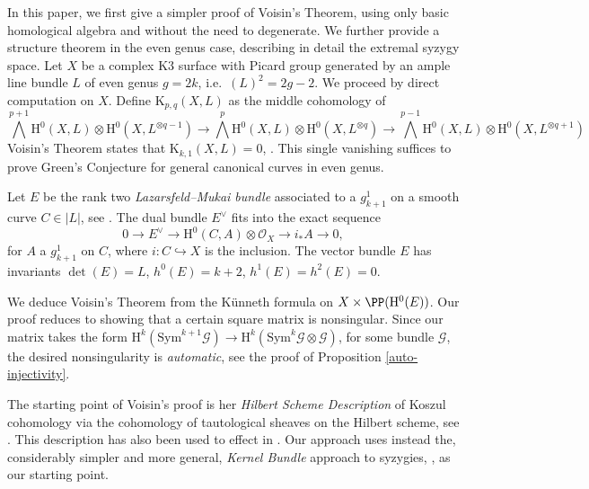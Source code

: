 
In this paper, we first give a simpler proof of Voisin's Theorem, using only basic homological algebra and without the need to degenerate. We further provide a structure theorem in the even genus case, describing in detail the extremal syzygy space. Let $X$ be a complex K3 surface with Picard group generated by an ample line bundle $L$ of even genus $g=2k$, i.e.\ $(L)^2=2g-2$. We proceed by direct computation on $X$. Define $\mathrm{K}_{p,q}(X,L)$ as the middle cohomology of
{\small{$$\bigwedge^{p+1} \mathrm{H}^0(X,L) \otimes \mathrm{H}^0(X,L^{\otimes q-1}) \to \bigwedge^p \mathrm{H}^0(X,L) \otimes \mathrm{H}^0(X,L^{\otimes q}) \to \bigwedge^{p-1} \mathrm{H}^0(X,L) \otimes \mathrm{H}^0(X,L^{\otimes q+1}) $$}}
 Voisin's Theorem states that $\mathrm{K}_{k,1}(X,L)=0$, \cite{V1}. This single vanishing suffices to prove Green's Conjecture for general canonical curves in even genus.


Let $E$ be the rank two \emph{Lazarsfeld--Mukai bundle} associated to a $g^1_{k+1}$ on a smooth curve $C \in |L|$, see \cite{lazarsfeld-BNP}. The dual bundle $E^{\vee}$ fits into the exact sequence
$$0 \to E^{\vee} \to \mathrm{H}^0(C,A) \otimes \mathcal{O}_X \to i_*A \to 0,$$
for $A$ a $g^1_{k+1}$ on $C$, where $i: C \hookrightarrow X$ is the inclusion. The vector bundle $E$ has invariants $\det(E)=L$, $h^0(E)=k+2$, $h^1(E)=h^2(E)=0$.


We deduce Voisin's Theorem from the K\"unneth formula on $X \times \PP(\mathrm{H}^0(E))$. Our proof reduces to showing that a certain square matrix is nonsingular. Since our matrix takes the form $\mathrm{H}^k(\mathrm{Sym}^{k+1} \mathcal{G}) \to \mathrm{H}^k(\mathrm{Sym}^{k} \mathcal{G} \otimes \mathcal{G})$, for some bundle $\mathcal{G}$, the desired nonsingularity is \emph{automatic}, see the proof of Proposition \ref{auto-injectivity}.

The starting point of Voisin's proof \cite{V1} is her \emph{Hilbert Scheme Description} of Koszul cohomology via the cohomology of tautological sheaves on the Hilbert scheme, see \cite[\S 5]{aprodu-nagel}. This description has also been used to effect in \cite{ein-lazarsfeld-gonality}. Our approach uses instead the, considerably simpler and more general, \emph{Kernel Bundle} approach to syzygies, \cite{lazarsfeld-VBT}, as our starting point.

